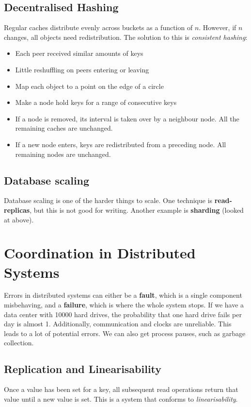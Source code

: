 \documentclass[11pt,a4paper,titlepage,dvipsnames,cmyk]{scrartcl}
\begin{document}
\subsection{Decentralised Hashing}
Regular caches distribute evenly across buckets as a function of $n$. However, if $n$ changes, all objects need redistribution. The solution to this is \textit{consistent hashing}:
\begin{itemize}
    \item Each peer received similar amounts of keys
    \item Little reshuffling on peers entering or leaving
    \item Map each object to a point on the edge of a circle
    \item Make a node hold keys for a range of consecutive keys
    \item If a node is removed, its interval is taken over by a neighbour node. All the remaining caches are unchanged.
    \item If a new node enters, keys are redistributed from a preceding node. All remaining nodes are unchanged.
\end{itemize}

\subsection{Database scaling}
Database scaling is one of the harder things to scale. One technique is \textbf{read-replicas}, but this is not good for writing. Another example is \textbf{sharding} (looked at above). 

\section{Coordination in Distributed Systems}
Errors in distributed systems can either be a \textbf{fault}, which is a single component misbehaving, and a \textbf{failure}, which is where the whole system stops. If we have a data center with 10000 hard drives, the probability that one hard drive fails per day is almost 1. Additionally, communication and clocks are unreliable. This leads to a lot of potential errors. We can also get process pauses, such as garbage collection.

\subsection{Replication and Linearisability}
Once a value has been set for a key, all subsequent read operations return that value until a new value is set. This is a system that conforms to \textit{linearisability}.
\end{document}
